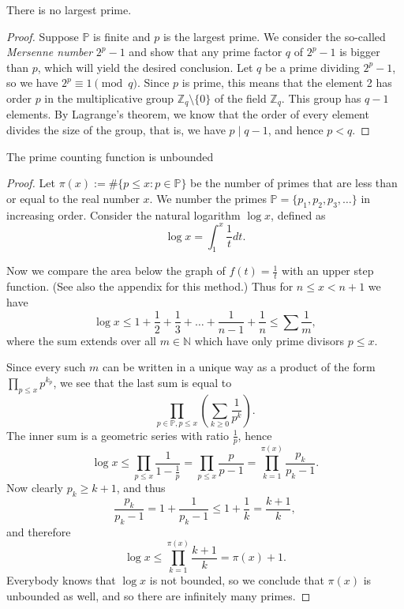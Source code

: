 \begin{theorem}
    \label{thm:third_proof}
    \leanok
    There is no largest prime.
\end{theorem}
\begin{proof}
    \leanok
    Suppose \(\mathbb{P}\) is finite and \(p\) is the largest prime.
    We consider the so-called \emph{Mersenne number} \(2^p - 1\)
    and show that any prime factor \(q\) of \(2^p - 1\) is bigger than \(p\),
    which will yield the desired conclusion.
    Let \(q\) be a prime dividing \(2^p - 1\), so we have \(2^p \equiv 1 \pmod{q}\). Since \(p\) is prime,
    this means that the element 2 has order \(p\) in the multiplicative group \(\mathbb{Z}_q \setminus \{0\}\)
    of the field \(\mathbb{Z}_q\). This group has \(q - 1\) elements.
    By Lagrange's theorem, we know that the order of every element divides the size of the group, that is,
    we have \(p \mid q - 1\), and hence \(p < q\).
\end{proof}

\begin{theorem}
    \label{thm:fourth_proof}
    \leanok
    The prime counting function is unbounded
\end{theorem}
\begin{proof}
    Let \(\pi(x) := \#\{p \leq x : p \in \mathbb{P}\}\) be the number of primes that are less than or equal to the real number \(x\).
    We number the primes \(\mathbb{P} = \{p_1, p_2, p_3, \dots \}\) in increasing order.
    Consider the natural logarithm \(\log x\), defined as
    \[
    \log x = \int_1^x \frac{1}{t} dt.
    \]

    Now we compare the area below the graph of \(f(t) = \frac{1}{t}\) with an upper step function.
    (See also the appendix for this method.) Thus for \(n \leq x < n+1\) we have
    \[
    \log x \leq 1 + \frac{1}{2} + \frac{1}{3} + \dots + \frac{1}{n-1} + \frac{1}{n} \leq \sum \frac{1}{m},
    \]
    where the sum extends over all \(m \in \mathbb{N}\) which have only prime divisors \(p \leq x\).

    Since every such \(m\) can be written in a unique way as a product of the form \(\prod_{p \leq x} p^{k_p}\),
    we see that the last sum is equal to
    \[
    \prod_{p \in \mathbb{P}, p \leq x} \left( \sum_{k \geq 0} \frac{1}{p^k} \right).
    \]
    The inner sum is a geometric series with ratio \(\frac{1}{p}\), hence
    \[
    \log x \leq \prod_{p \leq x} \frac{1}{1 - \frac{1}{p}} = \prod_{p \leq x} \frac{p}{p - 1} = \prod_{k=1}^{\pi(x)} \frac{p_k}{p_k - 1}.
    \]
    Now clearly \(p_k \geq k+1\), and thus
    \[
    \frac{p_k}{p_k - 1} = 1 + \frac{1}{p_k - 1} \leq 1 + \frac{1}{k} = \frac{k+1}{k},
    \]
    and therefore
    \[
    \log x \leq \prod_{k=1}^{\pi(x)} \frac{k+1}{k} = \pi(x) + 1.
    \]
    Everybody knows that \(\log x\) is not bounded, so we conclude that \(\pi(x)\) is unbounded as well, and so there are infinitely many primes.
\end{proof}

